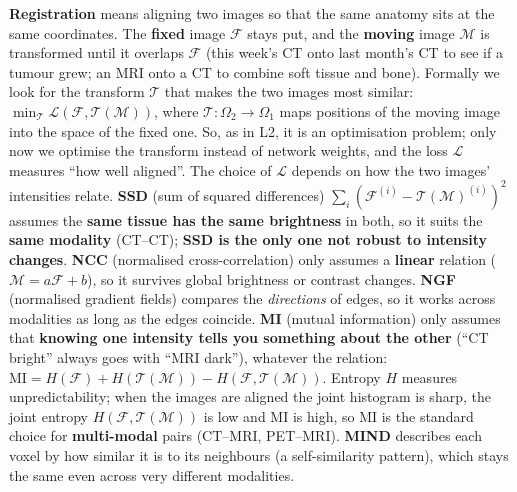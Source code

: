 \documentclass[a4paper]{article}
\newcommand{\K}[1]{\textcolor{kg}{\textbf{#1}}}
\newcommand{\F}[1]{\textcolor{fb}{#1}}
\newcommand{\E}[1]{\textcolor{ep}{#1}}
\newcommand{\T}[1]{\textcolor{tr}{\textbf{#1}}}
\newcommand{\Om}{\Omega}
\begin{document}
\K{Registration} means aligning two images so that the same anatomy sits at the same coordinates. The \K{fixed} image $\mathcal F$ stays put, and the \K{moving} image $\mathcal M$ is transformed until it overlaps $\mathcal F$ (\E{this week's CT onto last month's CT to see if a tumour grew; an MRI onto a CT to combine soft tissue and bone}). Formally we look for the transform $\mathcal T$ that makes the two images most similar: \F{$\min_{\mathcal T}\mathcal L(\mathcal F,\mathcal T(\mathcal M))$}, where $\mathcal T:\Om_2\to\Om_1$ maps positions of the moving image into the space of the fixed one. So, as in L2, it is an optimisation problem; only now we optimise the transform instead of network weights, and the loss $\mathcal L$ measures ``how well aligned''.
The choice of $\mathcal L$ depends on how the two images' intensities relate. \K{SSD} (sum of squared differences) \F{$\sum_i(\mathcal F^{(i)}-\mathcal T(\mathcal M)^{(i)})^2$} assumes the \K{same tissue has the same brightness} in both, so it suits the \K{same modality} (\E{CT--CT}); \T{SSD is the only one not robust to intensity changes}. \K{NCC} (normalised cross-correlation) only assumes a \K{linear} relation ($\mathcal M=a\mathcal F+b$), so it survives global brightness or contrast changes. \K{NGF} (normalised gradient fields) compares the \emph{directions} of edges, so it works across modalities as long as the edges coincide. \K{MI} (mutual information) only assumes that \K{knowing one intensity tells you something about the other} (\E{``CT bright'' always goes with ``MRI dark''}), whatever the relation: \F{$\text{MI}=H(\mathcal F)+H(\mathcal T(\mathcal M))-H(\mathcal F,\mathcal T(\mathcal M))$}. Entropy $H$ measures unpredictability; when the images are aligned the joint histogram is sharp, the joint entropy $H(\mathcal F,\mathcal T(\mathcal M))$ is low and MI is high, so MI is the standard choice for \K{multi-modal} pairs (\E{CT--MRI, PET--MRI}). \K{MIND} describes each voxel by how similar it is to its neighbours (a self-similarity pattern), which stays the same even across very different modalities.
\end{document}
